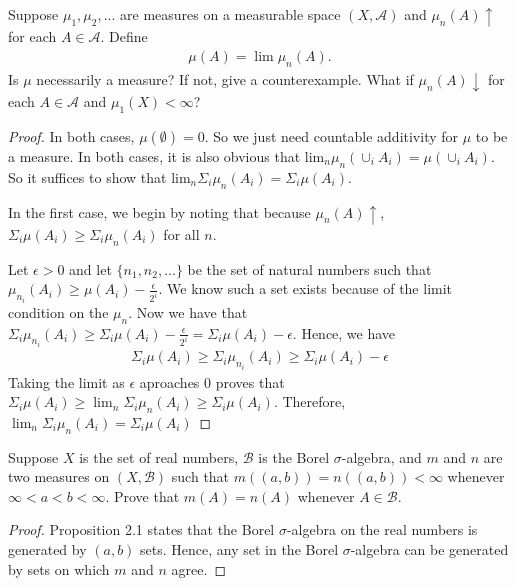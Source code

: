 \documentclass[10pt]{article}
\newenvironment{problem}[2][Problem]{\begin{trivlist}
		\item[\hskip \labelsep {\bfseries #1}\hskip \labelsep {\bfseries #2.}]}{\end{trivlist}}
\begin{document}
	\begin{problem}{7}
		Suppose $\mu_1, \mu_2, ...$ are measures on a measurable
		space $(X, \mathcal{A})$ and $\mu_n(A)\uparrow$ for each $A \in \mathcal{A}$. Define
		\begin{align*}
			\mu(A) = \lim \mu_n(A).
		\end{align*}
		Is $\mu$ necessarily a measure? If not, give a counterexample. What if $\mu_n(A)\downarrow$ for each $A \in \mathcal{A}$ and $\mu_1(X) < \infty$?
		\begin{proof}
			In both cases, $\mu(\emptyset)=0$. So we just need countable additivity for $\mu$ to be a measure. In both cases, it is also obvious that $\text{lim}_n \mu_n(\cup_i A_i) = \mu(\cup_i A_i)$. So it suffices to show that $\text{lim}_n \Sigma_i \mu_n(A_i) = \Sigma_i \mu(A_i)$.
			
			In the first case, we begin by noting that because $\mu_n(A) \uparrow$, $\Sigma_i \mu(A_i) \geq \Sigma_i \mu_n(A_i)$ for all $n$. 
			
			Let $\epsilon>0$ and let $\{n_1, n_2, ...\}$ be the set of natural numbers such that $\mu_{n_i}(A_i) \geq \mu(A_i) - \frac{\epsilon}{2^i}$. We know such a set exists because of the limit condition on the $\mu_n$. Now we have that $\Sigma_i \mu_{n_i}(A_i) \geq \Sigma_i \mu(A_i) - \frac{\epsilon}{2^i} = \Sigma_i \mu(A_i) - \epsilon$. Hence, we have
			\begin{align*}
				\Sigma_i \mu(A_i) \geq \Sigma_i \mu_{n_i}(A_i) \geq \Sigma_i \mu(A_i) - \epsilon
			\end{align*}
			Taking the limit as $\epsilon$ aproaches $0$ proves that $\Sigma_i \mu(A_i) \geq \lim_n \Sigma_i \mu_{n}(A_i) \geq \Sigma_i \mu(A_i)$. Therefore, $\lim_n \Sigma_i \mu_{n}(A_i) = \Sigma_i \mu(A_i)$
		\end{proof}
	\end{problem}
	
	\begin{problem}{9}
		Suppose $X$ is the set of real numbers, $\mathcal{B}$ is the Borel $\sigma$-algebra, and $m$ and $n$ are two measures on $(X, \mathcal{B})$ such that	$m((a, b)) = n((a, b)) < \infty$ whenever $\infty < a < b < \infty$. Prove that $m(A) = n(A)$ whenever $A \in \mathcal{B}$.
		\begin{proof}
			Proposition 2.1 states that the Borel $\sigma$-algebra on the real numbers is generated by $(a,b)$ sets. Hence, any set in the Borel $\sigma$-algebra can be generated by sets on which $m$ and $n$ agree. 
		\end{proof}
	\end{problem}
	
\end{document}
